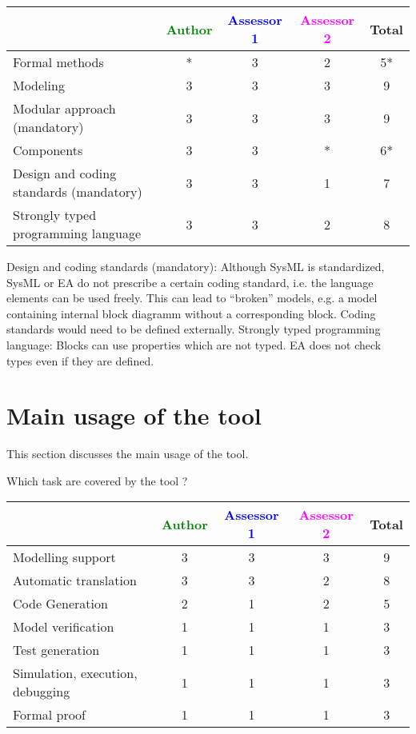 \begin{tabular}{|l | c | c | c | c|}
\hline
& \textcolor{green}{Author} & \textcolor{blue}{Assessor 1} & \textcolor{magenta}{Assessor 2} & Total \\
\hline
Formal methods  &* & 3&  2& 5* \\
\hline 
Modeling  &3 & 3& 3 &  9 \\
\hline
Modular approach (mandatory) &3 & 3& 3& 9 \\
\hline
Components &3 & 3& * &  6* \\
\hline
Design and coding standards (mandatory) &3 & 3& 1& 7 \\
\hline
Strongly typed programming language &3 & 3& 2 & 8  \\
\hline

\end{tabular}

\begin{assessor2}
Design and coding standards (mandatory): Although SysML is standardized, SysML or EA do not prescribe a certain coding standard, i.e. the language elements can be used freely. This can lead to "`broken"' models, e.g. a model containing internal block diagramm without a corresponding block. Coding standards would need to be defined externally.
Strongly typed programming language: Blocks can use properties which are not typed. EA does not check types even if they are defined.
\end{assessor2}


\section{Main usage of the tool}
\label{main_usage}

This section discusses the main usage of the tool.

Which task are covered by the tool ?


\begin{tabular}{|l | c | c | c | c|}
\hline
& \textcolor{green}{Author} & \textcolor{blue}{Assessor 1} & \textcolor{magenta}{Assessor 2} & Total \\
\hline 
Modelling support &3 & 3& 3& 9 \\
\hline
Automatic translation  &3 & 3& 2& 8 \\
\hline
Code Generation  &2 & 1& 2& 5 \\
\hline
Model verification &1 & 1& 1& 3 \\
\hline
Test generation &1 & 1& 1& 3 \\
\hline
Simulation, execution, debugging &1 & 1& 1& 3 \\
\hline
Formal proof &1 & 1& 1& 3 \\
\hline
\end{tabular}

